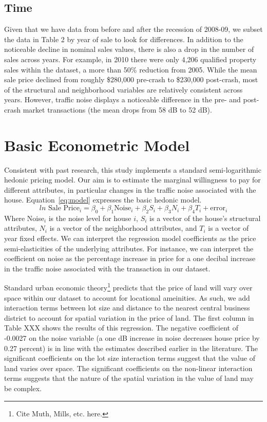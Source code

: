 \documentclass{article}\usepackage{graphicx, color}
\begin{document}
\subsection{Time}
Given that we have data from before and after the recession of 2008-09, we subset the data in Table 2 by year of sale to look for differences. In addition to the noticeable decline in nominal sales values, there is also a drop in the number of sales across years. For example, in 2010 there were only 4,206 qualified property sales within the dataset, a more than 50\% reduction from 2005. While the mean sale price declined from roughly \$280,000 pre-crash to \$230,000 post-crash, most of the structural and neighborhood variables are relatively consistent across years. However, traffic noise displays a noticeable difference in the pre- and post-crash market transactions (the mean drops from 58 dB to 52 dB). 

\section{Basic Econometric Model}\label{basicModel}
Consistent with past research, this study implements a standard semi-logarithmic hedonic pricing model. Our aim is to estimate the marginal willingness to pay for different attributes, in particular changes in the traffic noise associated with the house. Equation~\eqref{eq:model} expresses the basic hedonic model.
\begin{equation}\label{eq:model}	
ln \textrm{ Sale Price}_i = \beta _0 + \beta _1 \textrm{Noise}_i+ \beta _2 S_i+ \beta _3 N_i + \beta _4 T_i + \textrm{error}_i
\end{equation}
Where Noise$_i$ is the noise level for house $i$, $S_i$ is a vector of the house's structural attributes, $N_i$ is a vector of the neighborhood attributes, and $T_i$ is a vector of year fixed effects. We can interpret the regression model coefficients as the price semi-elasticities of the underlying attributes. For instance, we can interpret the coefficient on noise as the percentage increase in price for a one decibal increase in the traffic noise associated with the transaction in our dataset. 

Standard urban economic theory\footnote{Cite Muth, Mills, etc. here.} predicts that the price of land will vary over space within our dataset to account for locational ameinities. As such, we add interaction terms between lot size and distance to the nearest central business district to account for spatial variation in the price of land. The first column in Table XXX shows the results of this regression. The negative coefficient of -0.0027 on the noise variable (a one dB increase in noise decreases house price by 0.27 percent) is in line with the estimates described earlier in the literature. The significant coefficients on the lot size interaction terms suggest that the value of land varies over space. The significant coefficients on the non-linear interaction terms suggests that the nature of the spatial variation in the value of land may be complex.
\end{document}
